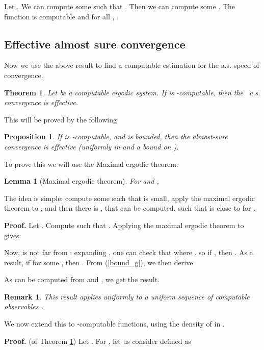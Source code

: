 \documentclass[copyright,creativecommons]{eptcs}
\newtheorem{theorem}{Theorem}
\newtheorem{lemma}{Lemma}
\newtheorem{proposition}{Proposition}
\newtheorem{remark}{Remark}
\numberwithin{equation}{section}
\begin{document}
Let . We can compute some  such that . Then we can compute some . The function  is
computable and for all , .


\subsection{Effective almost sure convergence}

Now we use the above result to find a computable estimation for the a.s.
speed of convergence.

\begin{theorem}
\label{corollaryx}Let  be a computable ergodic system. If  is
-computable, then the \ a.s. convergence is effective.
\end{theorem}

This will be proved by the following

\begin{proposition}
\label{theorem_ergodic_effective_as_convergence} If  is -computable, and  is bounded, then
the almost-sure convergence is effective (uniformly in  and a bound on  ). 
\end{proposition}

To prove this we will use the Maximal ergodic theorem:

\begin{lemma}[Maximal ergodic theorem]
\label{lemma_maximal} For  and ,

\end{lemma}

The idea is simple: compute some  such that  is small,
apply the maximal ergodic theorem to , and then there is , that can be computed, such that  is close to 
for .

{\bf Proof.}
Let . Compute  such that . Applying the maximal ergodic theorem to  gives:


Now,  is not far from : expanding , one can
check that
where .  so if , then . As a result, if  for some , then . From (\ref{bound_g}), we then derive


As  can be computed from  and , we get the result.


\begin{remark}
\label{remarkboundunif}This result applies uniformly to a uniform sequence
of computable  observables .
\end{remark}

We now extend this to -computable functions, using the
density of  in .

{\bf Proof.}
(of Theorem \ref{corollaryx}) Let . For , let us consider  defined as
\end{document}
